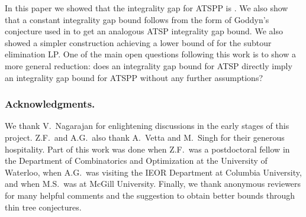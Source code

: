 \documentclass[11pt]{article}
\theoremstyle{definition}
\begin{document}
In this paper we showed that the integrality gap for ATSPP is .
We also show that a constant integrality gap bound follows
from the form of Goddyn's conjecture used in \cite{GS11}
to get an analogous ATSP integrality gap bound.
We also showed a simpler construction achieving a lower
bound of  for the subtour elimination LP.
One of the main open questions following this work is to
show a more general reduction: does an  integrality
gap bound for ATSP directly imply an  integrality gap bound
for ATSPP without any further assumptions?

















\subsubsection*{Acknowledgments.} We thank V.~Nagarajan for enlightening
discussions in the early stages of this project. Z.F.\ and A.G.\ also
thank A.~Vetta and M.~Singh for their generous hospitality. Part of this work was done when
Z.F.\ was a postdoctoral fellow in the Department of Combinatorics and Optimization at the University of
Waterloo, when A.G.\ was visiting the IEOR Department at Columbia
University, and  when M.S.\ was at McGill University.
Finally, we thank anonymous reviewers for many helpful comments and the suggestion to obtain better bounds through thin tree conjectures.


{\small }
\end{document}
